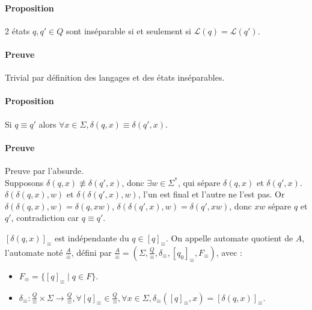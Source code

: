 \paragraph{Proposition} %
\label{par:proposition}

2 états $q,q' \in Q$ sont inséparable si et seulement si $\mathcal{L}(q) = \mathcal{L}(q')$.



\paragraph{Preuve} %
\label{par:preuve}

Trivial par définition des langages et des états inséparables.



\paragraph{Proposition} %
\label{par:proposition}

Si $q \equiv q'$ alors $\forall x \in \Sigma, \delta(q,x) \equiv \delta(q',x)$.



\paragraph{Preuve} %
\label{par:preuve}

Preuve par l'absurde.\\
Supposons $\delta(q,x) \not \equiv \delta(q',x)$, donc $\exists w \in \Sigma^*$, qui sépare $\delta(q,x)$ et $\delta(q',x)$.\\
$\delta(\delta(q,x),w)$ et $\delta(\delta(q',x),w)$, l'un est final et l'autre ne l'est pas. Or $\delta(\delta(q,x),w) = \delta(q,xw)$, $\delta(\delta(q',x),w)=\delta(q',xw)$, donc $xw$ sépare $q$ et $q'$, contradiction car $q \equiv q'$.



$[\delta(q,x)]_{\equiv}$ est indépendante du $q \in [q]_{\equiv}$. On appelle automate quotient de $A$, l'automate noté $\frac{A}{\equiv}$, défini par $\frac{A}{\equiv}=(\Sigma,\frac{Q}{\equiv},\delta_{\equiv},[q_0]_{\equiv},F_{\equiv})$, avec :\\

\begin{itemize}
	\item $F_{\equiv} = \{[q]_{\equiv} \mid q \in F\}$.
	\item $\delta_{\equiv} : \frac{Q}{\equiv} \times \Sigma \rightarrow \frac{Q}{\equiv}, \forall [q]_{\equiv} \in \frac{Q}{\equiv}, \forall x \in \Sigma, \delta_{\equiv}([q]_{\equiv},x)=[\delta(q,x)]_{\equiv}$.\\
\end{itemize}



